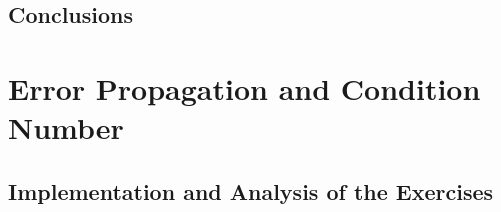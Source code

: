 
\subsection{Conclusions}

\section{Error Propagation and Condition Number}

\subsection{Implementation and Analysis of the Exercises}


